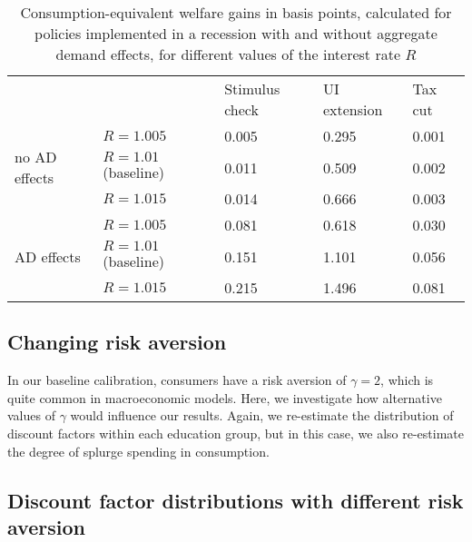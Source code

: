 \documentclass[\PathToRoot/\ProjectName]{subfiles}
\begin{document}
\begin{table}[t]
  \begin{center}
    \begin{tabular}
      {@{}lllll@{}}
      \toprule
                                     &                       & Stimulus check & UI extension & Tax cut \\ \cmidrule(l){1-5}
      \multirow{3}{*}{no AD effects} & $R = 1.005$           & 0.005          & 0.295        & 0.001   \\
                                     & $R = 1.01$ (baseline) & 0.011          & 0.509        & 0.002   \\
                                     & $R = 1.015$           & 0.014          & 0.666        & 0.003   \\ \cmidrule(l){1-5}
      \multirow{3}{*}{AD effects}    & $R = 1.005$           & 0.081          & 0.618        & 0.030   \\
                                     & $R = 1.01$ (baseline) & 0.151          & 1.101        & 0.056   \\
                                     & $R = 1.015$           & 0.215          & 1.496        & 0.081   \\ \cmidrule(l){1-5}
    \end{tabular}
    \caption{Consumption-equivalent welfare gains in basis points, calculated for policies implemented in a recession with and without aggregate demand effects, for different values of the interest rate $R$}
    \whenintegrated{\label{tab:robustness_R_results}} 
  \end{center}
\end{table}

\FloatBarrier
\hypertarget{changing-risk-aversion}{}\par\subsection*{Changing risk aversion}
\whenintegrated{\label{sec:robust_gamma}} 

In our baseline calibration, consumers have a risk aversion of $\gamma=2$, which is quite common in macroeconomic models.
Here, we investigate how alternative values of $\gamma$ would influence our results.
Again, we re-estimate the distribution of discount factors within each education group, but in this case, we also re-estimate the degree of splurge spending in consumption.

\subsection*{Discount factor distributions with different risk aversion}
\whenintegrated{\label{sec:robust_gamma_estim}} 
\end{document}
